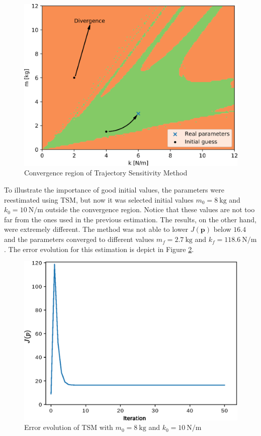 \begin{figure}[H]
	\caption{Convergence region of Trajectory Sensitivity Method}
	\begin{center}
		\includegraphics[scale=0.6]{Images/convergence_region.eps}
	\end{center}
	\label{fig: conv_reg}
\end{figure}

To illustrate the importance of good initial values, the parameters were reestimated using TSM, but now it was selected initial values $m_{0} = 8\ \text{kg}$ and $k_{0} = 10\ \text{N/m}$ outside the convergence region. Notice that these values are not too far from the ones used in the previous estimation. The results, on the other hand, were extremely different. The method was not able to lower $J(\mathbf{p})$ below $16.4$ and the parameters converged to different values $m_{f} = 2.7\ \text{kg}$ and $k_{f} = 118.6\ \text{N/m}$. The error evolution for this estimation is depict in Figure \ref{fig: TS_nconv}.

\begin{figure}[h]
	\caption{Error evolution of TSM with $m_{0} = 8\ \text{kg}$ and $k_{0} = 10\ \text{N/m}$}
	\begin{center}
		\includegraphics[scale=0.6]{Images/TS_nconv.eps}
	\end{center}
	\label{fig: TS_nconv}
\end{figure}

